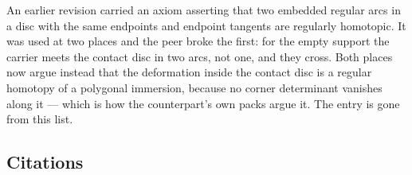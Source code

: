 \begin{remark}\label{rem:arcremoved}
An earlier revision carried an axiom asserting that two embedded regular arcs
in a disc with the same endpoints and endpoint tangents are regularly
homotopic. It was used at two places and the peer broke the first: for the
empty support the carrier meets the contact disc in two arcs, not one, and they
cross. Both places now argue instead that the deformation inside the contact
disc is a regular homotopy of a polygonal immersion, because no corner
determinant vanishes along it --- which is how the counterpart's own packs
argue it. The entry is gone from this list.
\end{remark}

\subsection{Citations}\label{sec:axcitations}

